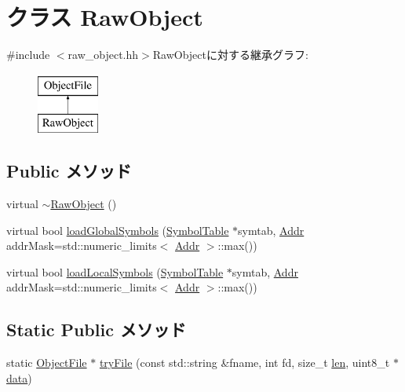 \hypertarget{classRawObject}{
\section{クラス RawObject}
\label{classRawObject}
}


{\ttfamily \#include $<$raw\_\-object.hh$>$}RawObjectに対する継承グラフ:\begin{figure}[H]
\begin{center}
\leavevmode
\includegraphics[height=2cm]{classRawObject}
\end{center}
\end{figure}
\subsection*{Public メソッド}
\begin{DoxyCompactItemize}
\item 
virtual \hyperlink{classRawObject_a466628ccdca732c9c94d786536b3f785}{$\sim$RawObject} ()
\item 
virtual bool \hyperlink{classRawObject_a1de102f86bbb53d20455d9e78be53935}{loadGlobalSymbols} (\hyperlink{classSymbolTable}{SymbolTable} $\ast$symtab, \hyperlink{base_2types_8hh_af1bb03d6a4ee096394a6749f0a169232}{Addr} addrMask=std::numeric\_\-limits$<$ \hyperlink{base_2types_8hh_af1bb03d6a4ee096394a6749f0a169232}{Addr} $>$::max())
\item 
virtual bool \hyperlink{classRawObject_aab9393b89c15838ac1b842e642f981bb}{loadLocalSymbols} (\hyperlink{classSymbolTable}{SymbolTable} $\ast$symtab, \hyperlink{base_2types_8hh_af1bb03d6a4ee096394a6749f0a169232}{Addr} addrMask=std::numeric\_\-limits$<$ \hyperlink{base_2types_8hh_af1bb03d6a4ee096394a6749f0a169232}{Addr} $>$::max())
\end{DoxyCompactItemize}
\subsection*{Static Public メソッド}
\begin{DoxyCompactItemize}
\item 
static \hyperlink{classObjectFile}{ObjectFile} $\ast$ \hyperlink{classRawObject_a3b119de4852833fdf74dbb4b8e1e1eba}{tryFile} (const std::string \&fname, int fd, size\_\-t \hyperlink{classObjectFile_a7360b55975153b822efc5217b7734e6a}{len}, uint8\_\-t $\ast$\hyperlink{classObjectFile_abbae3bd152e2d64768026e03593e64f3}{data})
\end{DoxyCompactItemize}
